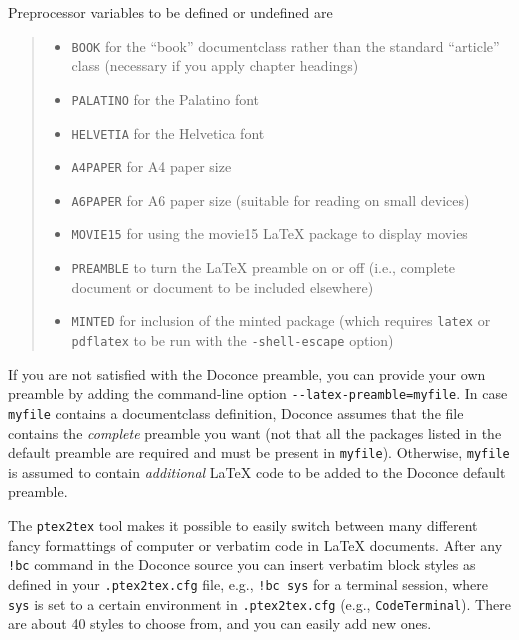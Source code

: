 \documentclass[a4paper]{article}
\begin{document}
Preprocessor variables to be defined or undefined are
%
\begin{quote}
%
\begin{itemize}

\item \texttt{BOOK} for the ``book'' documentclass rather than the standard
``article'' class (necessary if you apply chapter headings)

\item \texttt{PALATINO} for the Palatino font

\item \texttt{HELVETIA} for the Helvetica font

\item \texttt{A4PAPER} for A4 paper size

\item \texttt{A6PAPER} for A6 paper size (suitable for reading on small devices)

\item \texttt{MOVIE15} for using the movie15 LaTeX package to display movies

\item \texttt{PREAMBLE} to turn the LaTeX preamble on or off (i.e., complete document
or document to be included elsewhere)

\item \texttt{MINTED} for inclusion of the minted package (which requires \texttt{latex}
or \texttt{pdflatex} to be run with the \texttt{-shell-escape} option)

\end{itemize}

\end{quote}

If you are not satisfied with the Doconce preamble, you can provide
your own preamble by adding the command-line option \texttt{-{}-latex-preamble=myfile}.
In case \texttt{myfile} contains a documentclass definition, Doconce assumes
that the file contains the \emph{complete} preamble you want (not that all
the packages listed in the default preamble are required and must be
present in \texttt{myfile}). Otherwise, \texttt{myfile} is assumed to contain
\emph{additional} LaTeX code to be added to the Doconce default preamble.

The \texttt{ptex2tex} tool makes it possible to easily switch between many
different fancy formattings of computer or verbatim code in LaTeX
documents. After any \texttt{!bc} command in the Doconce source you can
insert verbatim block styles as defined in your \texttt{.ptex2tex.cfg}
file, e.g., \texttt{!bc sys} for a terminal session, where \texttt{sys} is set to
a certain environment in \texttt{.ptex2tex.cfg} (e.g., \texttt{CodeTerminal}).
There are about 40 styles to choose from, and you can easily add
new ones.
\end{document}
